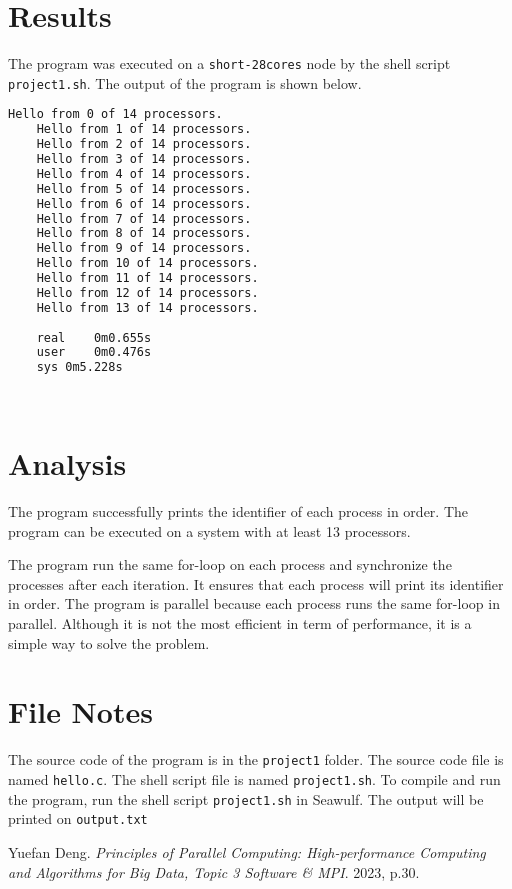 \documentclass[12pt,a4paper]{article}
\begin{document}
\section{Results}
The program was executed on a \texttt{short-28cores} node by the shell script \texttt{project1.sh}. The output of the program is shown below.
\begin{lstlisting}[language=bash]
    Hello from 0 of 14 processors.
    Hello from 1 of 14 processors.
    Hello from 2 of 14 processors.
    Hello from 3 of 14 processors.
    Hello from 4 of 14 processors.
    Hello from 5 of 14 processors.
    Hello from 6 of 14 processors.
    Hello from 7 of 14 processors.
    Hello from 8 of 14 processors.
    Hello from 9 of 14 processors.
    Hello from 10 of 14 processors.
    Hello from 11 of 14 processors.
    Hello from 12 of 14 processors.
    Hello from 13 of 14 processors.
    
    real	0m0.655s
    user	0m0.476s
    sys	0m5.228s
    
    
\end{lstlisting}


\section{Analysis}
The program successfully prints the identifier of each process in order. 
The program can be executed on a system with at least 13 processors. 

The program run the same for-loop on each process and synchronize the processes after each iteration. 
It ensures that each process will print its identifier in order.
The program is parallel because each process runs the same for-loop in parallel.
Although it is not the most efficient in term of performance, it is a simple way to solve the problem.

\section*{File Notes}

The source code of the program is in the \texttt{project1} folder. The source code file is named \texttt{hello.c}. The shell script file is named \texttt{project1.sh}. To compile and run the program, run the shell script \texttt{project1.sh} in Seawulf. The output will be printed on \texttt{output.txt}

\begin{thebibliography}{1}

    Yuefan Deng.
    \textit{Principles of Parallel Computing: High-performance Computing and Algorithms for Big Data, Topic 3 Software \& MPI}.
    2023, p.30.
    
\end{thebibliography}
\end{document}

